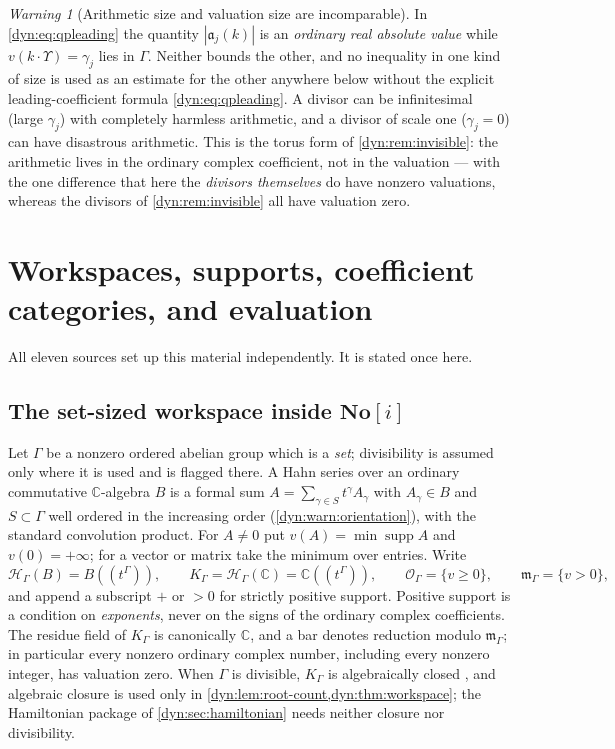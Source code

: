 \documentclass[11pt,letterpaper]{article}
\theoremstyle{definition}
\theoremstyle{remark}
\newtheorem{warning}[warning]{Warning}
\newcommand{\C}{\mathbb C}
\newcommand{\No}{\mathbf{No}}
\newcommand{\HH}{\mathscr H}
\newcommand{\OO}{\mathcal O}
\newcommand{\m}{\mathfrak m}
\newcommand{\supp}{\operatorname{supp}}
\newcommand{\fla}{\mathfrak a}
\numberwithin{equation}{section}
\begin{document}
\begin{warning}[Arithmetic size and valuation size are incomparable]
\label{dyn:warn:qptwosizes}
In \eqref{dyn:eq:qpleading} the quantity $|\fla_j(k)|$ is an \emph{ordinary
real absolute value} while $v(k\cdot\Upsilon)=\gamma_j$ lies in $\Gamma$.
Neither bounds the other, and no inequality in one kind of size is used as
an estimate for the other anywhere below without the explicit
leading-coefficient formula \eqref{dyn:eq:qpleading}. A divisor can be
infinitesimal (large $\gamma_j$) with completely harmless arithmetic, and a
divisor of scale one ($\gamma_j=0$) can have disastrous arithmetic. This is
the torus form of \cref{dyn:rem:invisible}: the arithmetic lives in the
ordinary complex coefficient, not in the valuation --- with the one
difference that here the \emph{divisors themselves} do have nonzero
valuations, whereas the divisors of \cref{dyn:rem:invisible} all have
valuation zero.
\end{warning}

\section{Workspaces, supports, coefficient categories, and evaluation}
\label{dyn:sec:framework}

All eleven sources set up this material independently. It is stated once
here.

\subsection{The set-sized workspace inside \texorpdfstring{$\No[i]$}{No[i]}}
Let $\Gamma$ be a nonzero ordered abelian group which is a \emph{set};
divisibility is assumed only where it is used and is flagged there. A Hahn
series over an ordinary commutative $\C$-algebra $B$ is a formal sum
$A=\sum_{\gamma\in S}t^{\gamma}A_\gamma$ with $A_\gamma\in B$ and
$S\subset\Gamma$ well ordered in the increasing order
(\cref{dyn:warn:orientation}), with the standard convolution product. For
$A\ne0$ put $v(A)=\min\supp A$ and $v(0)=+\infty$; for a vector or matrix
take the minimum over entries. Write
\[
 \HH_\Gamma(B)=B((t^{\Gamma})),\qquad
 K_\Gamma=\HH_\Gamma(\C)=\C((t^{\Gamma})),\qquad
 \OO_\Gamma=\{v\ge0\},\qquad \m_\Gamma=\{v>0\},
\]
and append a subscript $+$ or $>0$ for strictly positive support. Positive
support is a condition on \emph{exponents}, never on the signs of the
ordinary complex coefficients. The residue field of $K_\Gamma$ is
canonically $\C$, and a bar denotes reduction modulo $\m_\Gamma$; in
particular every nonzero ordinary complex number, including every nonzero
integer, has valuation zero. When $\Gamma$ is divisible, $K_\Gamma$ is
algebraically closed \cite[Cor.~4]{Poonen}, and algebraic closure is used
only in \cref{dyn:lem:root-count,dyn:thm:workspace}; the Hamiltonian
package of \cref{dyn:sec:hamiltonian} needs neither closure nor
divisibility.
\end{document}

